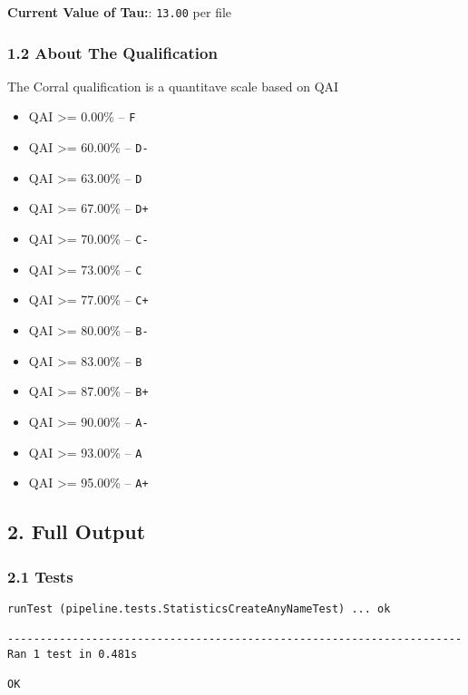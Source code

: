 \textbf{Current Value of Tau:}: \texttt{13.00} per file

\subsubsection{1.2 About The
Qualification}\label{about-the-qualification}

The Corral qualification is a quantitave scale based on QAI

\begin{itemize}
\tightlist
\item
  QAI \textgreater{}= 0.00\% -- \texttt{F}
\item
  QAI \textgreater{}= 60.00\% -- \texttt{D-}
\item
  QAI \textgreater{}= 63.00\% -- \texttt{D}
\item
  QAI \textgreater{}= 67.00\% -- \texttt{D+}
\item
  QAI \textgreater{}= 70.00\% -- \texttt{C-}
\item
  QAI \textgreater{}= 73.00\% -- \texttt{C}
\item
  QAI \textgreater{}= 77.00\% -- \texttt{C+}
\item
  QAI \textgreater{}= 80.00\% -- \texttt{B-}
\item
  QAI \textgreater{}= 83.00\% -- \texttt{B}
\item
  QAI \textgreater{}= 87.00\% -- \texttt{B+}
\item
  QAI \textgreater{}= 90.00\% -- \texttt{A-}
\item
  QAI \textgreater{}= 93.00\% -- \texttt{A}
\item
  QAI \textgreater{}= 95.00\% -- \texttt{A+}
\end{itemize}

\subsection{2. Full Output}\label{full-output}

\subsubsection{2.1 Tests}\label{tests}

\begin{verbatim}
runTest (pipeline.tests.StatisticsCreateAnyNameTest) ... ok

----------------------------------------------------------------------
Ran 1 test in 0.481s

OK
\end{verbatim}

